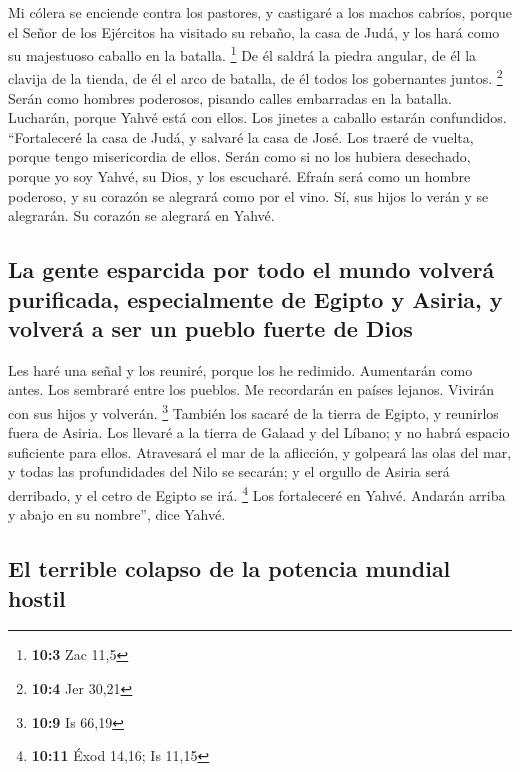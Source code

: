  Mi cólera se enciende contra los pastores, y castigaré a
los machos cabríos, porque el Señor de los Ejércitos ha visitado su
rebaño, la casa de Judá, y los hará como su majestuoso caballo en la
batalla. \footnote{\textbf{10:3} Zac 11,5}  De él saldrá
la piedra angular, de él la clavija de la tienda, de él el arco de
batalla, de él todos los gobernantes juntos. \footnote{\textbf{10:4} Jer
  30,21}  Serán como hombres poderosos, pisando calles
embarradas en la batalla. Lucharán, porque Yahvé está con ellos. Los
jinetes a caballo estarán confundidos.  ``Fortaleceré la
casa de Judá, y salvaré la casa de José. Los traeré de vuelta, porque
tengo misericordia de ellos. Serán como si no los hubiera desechado,
porque yo soy Yahvé, su Dios, y los escucharé.  Efraín
será como un hombre poderoso, y su corazón se alegrará como por el vino.
Sí, sus hijos lo verán y se alegrarán. Su corazón se alegrará en Yahvé.

\hypertarget{la-gente-esparcida-por-todo-el-mundo-volveruxe1-purificada-especialmente-de-egipto-y-asiria-y-volveruxe1-a-ser-un-pueblo-fuerte-de-dios}{%
\subsection{La gente esparcida por todo el mundo volverá purificada,
especialmente de Egipto y Asiria, y volverá a ser un pueblo fuerte de
Dios}\label{la-gente-esparcida-por-todo-el-mundo-volveruxe1-purificada-especialmente-de-egipto-y-asiria-y-volveruxe1-a-ser-un-pueblo-fuerte-de-dios}}

 Les haré una señal y los reuniré, porque los he redimido.
Aumentarán como antes.  Los sembraré entre los pueblos. Me
recordarán en países lejanos. Vivirán con sus hijos y volverán.
\footnote{\textbf{10:9} Is 66,19}  También los sacaré de
la tierra de Egipto, y reunirlos fuera de Asiria. Los llevaré a la
tierra de Galaad y del Líbano; y no habrá espacio suficiente para ellos.
 Atravesará el mar de la aflicción, y golpeará las olas
del mar, y todas las profundidades del Nilo se secarán; y el orgullo de
Asiria será derribado, y el cetro de Egipto se irá. \footnote{\textbf{10:11}
  Éxod 14,16; Is 11,15}  Los fortaleceré en Yahvé.
Andarán arriba y abajo en su nombre'', dice Yahvé.

\hypertarget{el-terrible-colapso-de-la-potencia-mundial-hostil}{%
\subsection{El terrible colapso de la potencia mundial
hostil}\label{el-terrible-colapso-de-la-potencia-mundial-hostil}}

